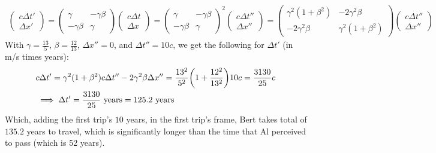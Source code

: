 \documentclass{article}
\DeclarePairedDelimiter{\paran}{(}{)}%
\begin{document}
\begin{align}
    \begin{pmatrix}
        c\Delta t'\\\Delta x'
    \end{pmatrix} = \begin{pmatrix}
        \gamma & -\gamma\beta\\
        -\gamma\beta & \gamma
    \end{pmatrix}\begin{pmatrix}
        c\Delta t\\\Delta x
    \end{pmatrix} = \begin{pmatrix}
        \gamma & -\gamma\beta\\
        -\gamma\beta & \gamma
    \end{pmatrix}^2 \begin{pmatrix}
        c\Delta t''\\\Delta x''
    \end{pmatrix} = \begin{pmatrix}
        \gamma^2(1+\beta^2) & -2\gamma^2\beta\\
        -2\gamma^2\beta & \gamma^2(1+\beta^2)
    \end{pmatrix}\begin{pmatrix}
        c\Delta t''\\\Delta x''
    \end{pmatrix}
\end{align}
With $\gamma = \frac{13}{5}$, $\beta = \frac{12}{13}$, $\Delta x''=0$, and $\Delta t''=10c$, we get the following for $\Delta t'$ (in m/s times years):
\begin{align}
    &c\Delta t' = \gamma^2(1+\beta^2)c\Delta t'' - 2\gamma^2\beta \Delta x'' = \frac{13^2}{5^2}\paran*{1+\frac{12^2}{13^2}}10c = \frac{3130}{25}c\\
    &\implies \Delta t' = \frac{3130}{25}\textmd{ years} = 125.2 \textmd{ years}
\end{align}
Which, adding the first trip's $10$ years, in the first trip's frame, Bert takes total of $135.2$ years to travel, which is significantly longer than the time that Al perceived to pass (which is 52 years). 

\end{document}
